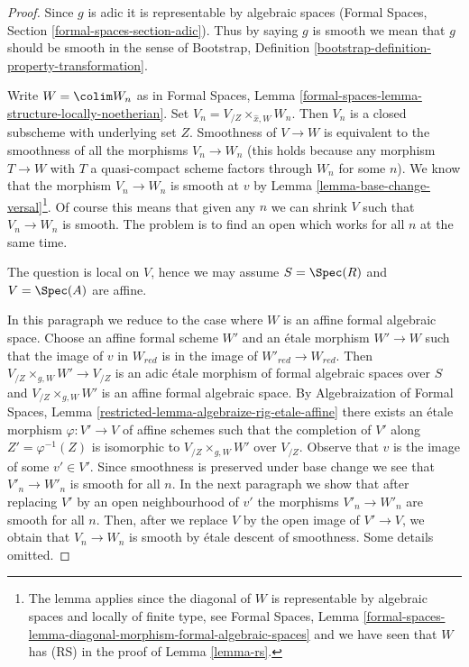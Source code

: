 \begin{proof}
Since $g$ is adic it is representable by algebraic spaces (Formal Spaces,
Section \ref{formal-spaces-section-adic}).
Thus by saying $g$ is smooth we mean that $g$ should be smooth
in the sense of
Bootstrap, Definition \ref{bootstrap-definition-property-transformation}.

\medskip\noindent
Write $W = \colim W_n$ as in Formal Spaces, Lemma
\ref{formal-spaces-lemma-structure-locally-noetherian}.
Set $V_n = V_{/Z} \times_{\hat x, W} W_n$.
Then $V_n$ is a closed subscheme with underlying set $Z$.
Smoothness of $V \to W$ is equivalent to the smoothness
of all the morphisms $V_n \to W_n$ (this holds because any morphism
$T \to W$ with $T$ a quasi-compact scheme factors through
$W_n$ for some $n$). We know that the morphism $V_n \to W_n$
is smooth at $v$ by
Lemma \ref{lemma-base-change-versal}\footnote{The lemma applies since
the diagonal of $W$ is representable by algebraic spaces and
locally of finite type, see Formal Spaces, Lemma
\ref{formal-spaces-lemma-diagonal-morphism-formal-algebraic-spaces}
and we have seen that $W$ has (RS) in the proof of Lemma \ref{lemma-rs}.}.
Of course this means that given any $n$ we can shrink $V$
such that $V_n \to W_n$ is smooth. The problem is to find
an open which works for all $n$ at the same time.

\medskip\noindent
The question is local on $V$, hence we may assume $S = \Spec(R)$ and
$V = \Spec(A)$ are affine.

\medskip\noindent
In this paragraph we reduce to the case where $W$ is an affine formal
algebraic space. Choose an affine formal scheme $W'$ and an \'etale morphism
$W' \to W$ such that the image of $v$ in $W_{red}$ is in the
image of $W'_{red} \to W_{red}$. Then $V_{/Z} \times_{g, W} W' \to V_{/Z}$
is an adic \'etale morphism of formal algebraic spaces over $S$
and $V_{/Z} \times_{g, W} W'$ is an affine formal algebraic space.
By Algebraization of Formal Spaces,
Lemma \ref{restricted-lemma-algebraize-rig-etale-affine}
there exists an \'etale morphism $\varphi : V' \to V$ of affine schemes
such that the completion of $V'$ along $Z' = \varphi^{-1}(Z)$
is isomorphic to $V_{/Z} \times_{g, W} W'$ over $V_{/Z}$.
Observe that $v$ is the image of some $v' \in V'$.
Since smoothness is preserved under base change we see that
$V'_n \to W'_n$ is smooth for all $n$. In the next paragraph
we show that after replacing $V'$ by an open neighbourhood of $v'$
the morphisms $V'_n \to W'_n$ are smooth for all $n$.
Then, after we replace $V$ by the open image of $V' \to V$,
we obtain that $V_n \to W_n$ is smooth by \'etale descent of smoothness.
Some details omitted.


\end{proof}
